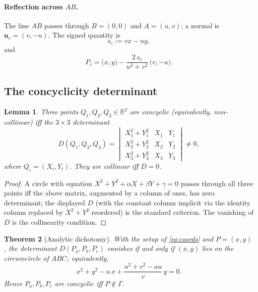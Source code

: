 \documentclass[11pt,a4paper]{article}
\newtheorem{theorem}{Theorem}[section]
\newtheorem{lemma}[theorem]{Lemma}
\theoremstyle{definition}
\newcommand{\R}{\mathbb{R}}
\newcommand{\Pa}{P_{a}}
\newcommand{\Pb}{P_{b}}
\newcommand{\Pc}{P_{c}}
\newcommand{\circc}{\Gamma}
\newcommand{\vv}[1]{\mathbf{#1}}
\begin{document}
\paragraph{Reflection across $AB$.}
The line $AB$ passes through $B=(0,0)$ and $A=(u,v)$; a normal is $\vv n_{c}=(v,-u)$. The signed quantity is
\begin{equation}\label{eq:sc}
s_{c}:=vx-uy,
\end{equation}
and
\begin{equation}\label{eq:Pc-coord}
\Pc=\bigl(x,y\bigr)-\frac{2\,s_{c}}{u^{2}+v^{2}}\,\bigl(v,-u\bigr).
\end{equation}

\subsection{The concyclicity determinant}

\begin{lemma}\label{lem:det}
Three points $Q_{1},Q_{2},Q_{3}\in\R^{2}$ are concyclic (equivalently, non-collinear) iff the $3\times 3$ determinant
\begin{equation}\label{eq:det}
D(Q_{1},Q_{2},Q_{3})=
\begin{vmatrix}
X_{1}^{2}+Y_{1}^{2} & X_{1} & Y_{1}\\
X_{2}^{2}+Y_{2}^{2} & X_{2} & Y_{2}\\
X_{3}^{2}+Y_{3}^{2} & X_{3} & Y_{3}
\end{vmatrix}\neq 0,
\end{equation}
where $Q_{i}=(X_{i},Y_{i})$. They are collinear iff $D=0$.
\end{lemma}
\begin{proof}
A circle with equation $X^{2}+Y^{2}+\alpha X+\beta Y+\gamma=0$ passes through all three points iff the above matrix, augmented by a column of ones, has zero determinant; the displayed $D$ (with the constant column implicit via the identity column replaced by $X^{2}+Y^{2}$ reordered) is the standard criterion. The vanishing of $D$ is the collinearity condition.
\end{proof}

\begin{theorem}[Analytic dichotomy]\label{thm:analytic}
With the setup of \cref{eq:coords} and $P=(x,y)$, the determinant $D(\Pa,\Pb,\Pc)$ vanishes if and only if $(x,y)$ lies on the circumcircle of $ABC$; equivalently,
\begin{equation}\label{eq:circ-eq}
x^{2}+y^{2}-a\,x+\frac{u^{2}+v^{2}-a u}{v}\,y=0.
\end{equation}
Hence $\Pa,\Pb,\Pc$ are concyclic iff $P\notin\circc$.
\end{theorem}
\end{document}
